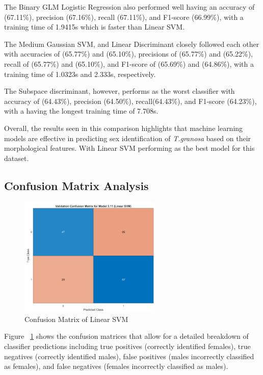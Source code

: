 The Binary GLM Logistic Regression also performed well having an accuracy of (67.11\%), precision (67.16\%), recall (67.11\%), and F1-score (66.99\%), with a training time of 1.9415s which is faster than Linear SVM. 

The Medium Gaussian SVM, and Linear Discriminant closely followed each other with accuracies of (65.77\%) and (65.10\%), precisions of (65.77\%) and (65.22\%), recall of (65.77\%) and (65.10\%), and F1-score of (65.69\%) and (64.86\%), with a training time of 1.0323s and 2.333s, respectively. 

The Subspace discriminant, however, performs as the worst classifier with accuracy of (64.43\%), precision (64.50\%), recall(64.43\%), and F1-score (64.23\%), with a having the longest training time of 7.708s. 

Overall, the results seen in this comparison highlights that machine learning models are effective in predicting sex identification of \textit{T.granosa} based on their morphological features. With Linear SVM performing as the best model for this dataset. 


\subsection{Confusion Matrix Analysis}
\begin{figure}[!htbp]
	\centering
	\includegraphics[width=0.6\textwidth]{figures/confusion-matrix.png}
	\caption{Confusion Matrix of Linear SVM}
	\label{fig:confusion-matrix}
\end{figure}

Figure ~\ref{fig:confusion-matrix} shows the confusion matrices that allow for a detailed breakdown of classifier predictions including true positives (correctly identified females), true negatives (correctly identified males), false positives (males incorrectly classified as females), and false negatives (females incorrectly classified as males).

